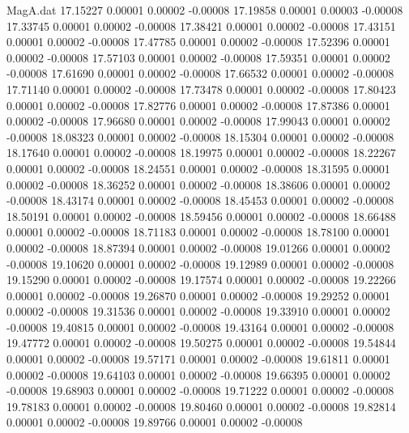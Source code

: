 \begin{filecontents}{MagA.dat}
  17.15227    0.00001    0.00002   -0.00008
  17.19858    0.00001    0.00003   -0.00008
  17.33745    0.00001    0.00002   -0.00008
  17.38421    0.00001    0.00002   -0.00008
  17.43151    0.00001    0.00002   -0.00008
  17.47785    0.00001    0.00002   -0.00008
  17.52396    0.00001    0.00002   -0.00008
  17.57103    0.00001    0.00002   -0.00008
  17.59351    0.00001    0.00002   -0.00008
  17.61690    0.00001    0.00002   -0.00008
  17.66532    0.00001    0.00002   -0.00008
  17.71140    0.00001    0.00002   -0.00008
  17.73478    0.00001    0.00002   -0.00008
  17.80423    0.00001    0.00002   -0.00008
  17.82776    0.00001    0.00002   -0.00008
  17.87386    0.00001    0.00002   -0.00008
  17.96680    0.00001    0.00002   -0.00008
  17.99043    0.00001    0.00002   -0.00008
  18.08323    0.00001    0.00002   -0.00008
  18.15304    0.00001    0.00002   -0.00008
  18.17640    0.00001    0.00002   -0.00008
  18.19975    0.00001    0.00002   -0.00008
  18.22267    0.00001    0.00002   -0.00008
  18.24551    0.00001    0.00002   -0.00008
  18.31595    0.00001    0.00002   -0.00008
  18.36252    0.00001    0.00002   -0.00008
  18.38606    0.00001    0.00002   -0.00008
  18.43174    0.00001    0.00002   -0.00008
  18.45453    0.00001    0.00002   -0.00008
  18.50191    0.00001    0.00002   -0.00008
  18.59456    0.00001    0.00002   -0.00008
  18.66488    0.00001    0.00002   -0.00008
  18.71183    0.00001    0.00002   -0.00008
  18.78100    0.00001    0.00002   -0.00008
  18.87394    0.00001    0.00002   -0.00008
  19.01266    0.00001    0.00002   -0.00008
  19.10620    0.00001    0.00002   -0.00008
  19.12989    0.00001    0.00002   -0.00008
  19.15290    0.00001    0.00002   -0.00008
  19.17574    0.00001    0.00002   -0.00008
  19.22266    0.00001    0.00002   -0.00008
  19.26870    0.00001    0.00002   -0.00008
  19.29252    0.00001    0.00002   -0.00008
  19.31536    0.00001    0.00002   -0.00008
  19.33910    0.00001    0.00002   -0.00008
  19.40815    0.00001    0.00002   -0.00008
  19.43164    0.00001    0.00002   -0.00008
  19.47772    0.00001    0.00002   -0.00008
  19.50275    0.00001    0.00002   -0.00008
  19.54844    0.00001    0.00002   -0.00008
  19.57171    0.00001    0.00002   -0.00008
  19.61811    0.00001    0.00002   -0.00008
  19.64103    0.00001    0.00002   -0.00008
  19.66395    0.00001    0.00002   -0.00008
  19.68903    0.00001    0.00002   -0.00008
  19.71222    0.00001    0.00002   -0.00008
  19.78183    0.00001    0.00002   -0.00008
  19.80460    0.00001    0.00002   -0.00008
  19.82814    0.00001    0.00002   -0.00008
  19.89766    0.00001    0.00002   -0.00008

\end{filecontents}
